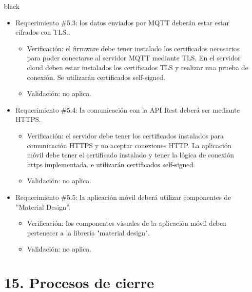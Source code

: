 \documentclass[
11pt, %
codirector, %
]{charter}
\begin{document}
\begin{consigna}{black}
\begin{itemize}
\item Requerimiento \#5.3: los datos enviados por MQTT deberán estar estar cifrados con TLS..

\begin{itemize}
	\item Verificación: el firmware debe tener instalado los certificados necesarios para poder conectarse al servidor MQTT mediante TLS. En el servidor cloud deben estar instalados los certificados TLS y realizar una prueba de conexión. Se utilizarán certificados self-signed. 
	\item Validación: no aplica.
\end{itemize}

\item Requerimiento \#5.4: la comunicación con la API Rest deberá ser mediante HTTPS.

\begin{itemize}
	\item Verificación: el servidor debe tener los certificados instalados para comunicación HTTPS y no aceptar conexiones HTTP. La aplicación móvil debe tener el certificado instalado y  tener la lógica de conexión https implementada. e utilizarán certificados self-signed. 
	\item Validación: no aplica.
\end{itemize}

\item Requerimiento \#5.5: la aplicación móvil deberá utilizar componentes de ”Material Design”.

\begin{itemize}
	\item Verificación: los componentes visuales de la aplicación móvil deben pertenecer a la librería "material design". 
	\item Validación: no aplica.
\end{itemize}

\end{itemize}
 
\end{consigna}

\pagebreak
\section{15. Procesos de cierre}    
\label{sec:cierre}
\end{document}
